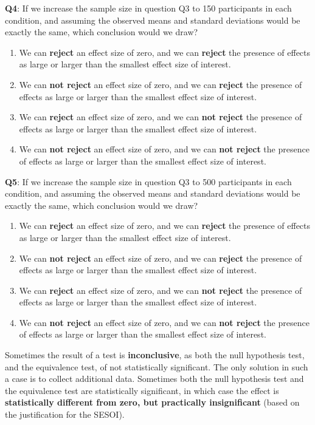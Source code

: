 \documentclass[
  oneside]{book}
\providecommand{\tightlist}{%
  \setlength{\itemsep}{0pt}\setlength{\parskip}{0pt}}
\begin{document}
\textbf{Q4}: If we increase the sample size in question Q3 to 150 participants in each condition, and assuming the observed means and standard deviations would be exactly the same, which conclusion would we draw?

\begin{enumerate}
\def\labelenumi{\Alph{enumi})}
\tightlist
\item
  We can \textbf{reject} an effect size of zero, and we can \textbf{reject} the presence of effects as large or larger than the smallest effect size of interest.
\item
  We can \textbf{not reject} an effect size of zero, and we can \textbf{reject} the presence of effects as large or larger than the smallest effect size of interest.
\item
  We can \textbf{reject} an effect size of zero, and we can \textbf{not reject} the presence of effects as large or larger than the smallest effect size of interest.
\item
  We can \textbf{not reject} an effect size of zero, and we can \textbf{not reject} the presence of effects as large or larger than the smallest effect size of interest.
\end{enumerate}

\textbf{Q5}: If we increase the sample size in question Q3 to 500 participants in each condition, and assuming the observed means and standard deviations would be exactly the same, which conclusion would we draw?

\begin{enumerate}
\def\labelenumi{\Alph{enumi})}
\tightlist
\item
  We can \textbf{reject} an effect size of zero, and we can \textbf{reject} the presence of effects as large or larger than the smallest effect size of interest.
\item
  We can \textbf{not reject} an effect size of zero, and we can \textbf{reject} the presence of effects as large or larger than the smallest effect size of interest.
\item
  We can \textbf{reject} an effect size of zero, and we can \textbf{not reject} the presence of effects as large or larger than the smallest effect size of interest.
\item
  We can \textbf{not reject} an effect size of zero, and we can \textbf{not reject} the presence of effects as large or larger than the smallest effect size of interest.
\end{enumerate}

Sometimes the result of a test is \textbf{inconclusive}, as both the null hypothesis test, and the equivalence test, of not statistically significant. The only solution in such a case is to collect additional data. Sometimes both the null hypothesis test and the equivalence test are statistically significant, in which case the effect is \textbf{statistically different from zero, but practically insignificant} (based on the justification for the SESOI).
\end{document}
